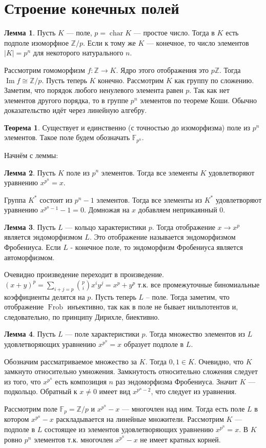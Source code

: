 \documentclass[10pt,a4paper,oneside]{book}
\theoremstyle{definition}
\newtheorem{thm}{{\color{red!40!black} Теорема}}
\newtheorem{lem}{{\color{green!50!black} Лемма}}
\newcommand{\mb}[1]{\mathbb{#1}}
\newcommand{\chr}{\operatorname{char}}
\newcommand{\im}{\operatorname{Im}}
\newcommand{\Frob}{\operatorname{Frob}}
\def\thrm{\begin{thm}}
\def\ethrm{\end{thm}}
\def\lm{\begin{lem}}
\def\elm{\end{lem}}
\begin{document}
\section{Строение конечных полей}

\lm Пусть $K$ --- поле, $p=\chr K$ --- простое число. Тогда в $K$ есть подполе изоморфное $\mb Z/p$. Если к тому же $K$ --- конечное, то число элементов $|K|=p^n$ для некоторого натурального $n$. 
\elm
\proof Рассмотрим гомоморфизм $f\colon \mb Z \to K$. Ядро этого отображения это $p\mb Z$. Тогда $\im f\cong \mb Z/p$. Пусть теперь $K$ конечно. Рассмотрим $K$ как группу по сложению. Заметим, что порядок любого ненулевого элемента равен $p$. Так как нет элементов другого порядка, то в группе $p^n$ элементов по теореме Коши.
\endproof
Обычно доказательство идёт через линейную алгебру.


\thrm Существует и единственно (с точностью до изоморфизма) поле из $p^n$ элементов. Такое поле будем обозначать $\mb F_{p^n}$.
\ethrm

Начнём с леммы:
\lm Пусть $K$ поле из $p^n$ элементов. Тогда все элементы $K$ удовлетворяют уравнению $x^{p^n}=x$.
\elm
\proof Группа $K^*$ состоит из $p^n-1$ элементов. Тогда все элементы из $K^*$ удовлетворяют уравнению $x^{p^n-1}-1=0$. Домножая на $x$ добавляем неприкаянный 0.
\endproof


\lm Пусть $L$ --- кольцо характеристики $p$. Тогда отображение $x\to x^{p}$ является эндоморфизмом $L$. Это отображение называется эндоморфизмом Фробениуса. Если $L$ - конечное поле, то эндоморфизм Фробениуса является автоморфизмом. 
\elm
\proof Очевидно произведение переходит в произведение. $(x+y)^p=\sum_{i+j=p}{{p}\choose{i}} x^iy^j= x^p+y^p$ т.к. все промежуточные биномиальные коэффициенты делятся на $p$. Пусть теперь $L$ -- поле. Тогда заметим, что отображение $\Frob$ инъективно, так как в поле не бывает нильпотентов и, следовательно, по принципу Дирихле, биективно.
\endproof

\lm Пусть $L$ --- поле характеристики $p$. Тогда множество элементов из $L$ удовлетворяющих уравнению $x^{p^n}=x$ образует подполе в $L$.
\elm
\proof Обозначим рассматриваемое множество за $K$. Тогда $0,1\in K$. Очевидно, что $K$ замкнуто относительно умножения. Замкнутость относительно сложения следует из того, что $x^{p^n}$ есть композиция $n$ раз эндоморфизма Фробениуса. Значит $K$ --- подкольцо. Обратный к $x\neq 0$ имеет вид $x^{p^n-2}$, что следует из уравнения.
\endproof


Рассмотрим поле $\mb F_p=\mb Z/p$ и $x^{p^n}-x$ --- многочлен над ним. Тогда есть поле $L$ в котором   $x^{p^n}-x$ раскладывается на линейные множители. Рассмотрим $K$ --- подполе в $L$ состоящее из элементов удовлетворяющих уравнению $x^{p^n}=x$. В $K$ ровно $p^n$ элементов т.к. многочлен $x^{p^n}-x$ не имеет кратных корней.
\end{document}
